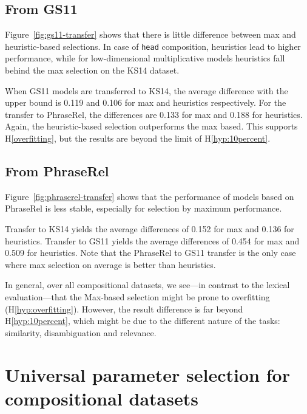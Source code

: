 \subsection{From GS11}
\label{sec:from-gs11}



Figure~\ref{fig:gs11-transfer} shows that there is little difference between max and heuristic-based selections. In case of \texttt{head} composition, heuristics lead to higher performance, while for low-dimensional multiplicative models heuristics fall behind the max selection on the KS14 dataset.

When GS11 models are transferred to KS14, the average difference with the upper bound is 0.119 and 0.106 for max and heuristics respectively. For the transfer to PhraseRel, the differences are 0.133 for max and 0.188 for heuristics. Again, the heuristic-based selection outperforms the max based. This supports H\ref{overfitting}, but the results are beyond the limit of H\ref{hyp:10percent}.

\subsection{From PhraseRel}
\label{sec:from-phraserel}



Figure~\ref{fig:phraserel-transfer} shows that the performance of models based on PhraseRel is less stable, especially for selection by maximum performance.

Transfer to KS14 yields the average differences of 0.152 for max and 0.136 for heuristics. Transfer to GS11 yields the average differences of 0.454 for max and 0.509 for heuristics. Note that the PhraseRel to GS11 transfer is the only case where max selection on average is better than heuristics.

In general, over all compositional datasets, we see---in contrast to the lexical evaluation---that the Max-based selection might be prone to overfitting (H\ref{hyp:overfitting}). However, the result difference is far beyond H\ref{hyp:10percent}, which might be due to the different nature of the tasks: similarity, disambiguation and relevance.

\section{Universal parameter selection for compositional datasets}
\label{sec:robust-param-comp-selecion}

